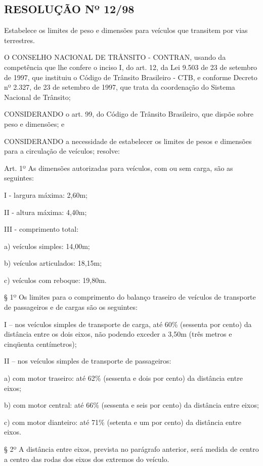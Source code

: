 \begin{anexosenv}

\partanexos

\chapter{RESOLUÇÃO Nº 12/98}

Estabelece os limites de peso e dimensões para veículos que transitem por vias terrestres.

O CONSELHO NACIONAL DE TRÂNSITO - CONTRAN, usando da competência que lhe confere o inciso I, do art. 12, da Lei 9.503 de 23 de setembro de 1997, que instituiu o Código de Trânsito Brasileiro - CTB, e conforme Decreto nº 2.327, de 23 de setembro de 1997, que trata da coordenação do Sistema Nacional de Trânsito;

CONSIDERANDO o art. 99, do Código de Trânsito Brasileiro, que dispõe sobre peso e dimensões; e

CONSIDERANDO a necessidade de estabelecer os limites de pesos e dimensões para a circulação de veículos; resolve:

Art. 1º As dimensões autorizadas para veículos, com ou sem carga, são as seguintes:

I   - largura máxima: 2,60m;

II  - altura máxima: 4,40m;

III - comprimento total:

a) veículos simples: 14,00m;

b) veículos articulados: 18,15m;

c) veículos com reboque: 19,80m.

§ 1º Os limites para o comprimento do balanço traseiro de veículos de transporte de passageiros e de cargas são os seguintes:

I – nos veículos simples de transporte de carga, até 60\% (sessenta por cento) da distância entre os dois eixos, não podendo exceder a 3,50m (três metros e cinqüenta centímetros);

II – nos veículos simples de transporte de passageiros:

a) com motor traseiro: até 62\% (sessenta e dois por cento) da distância entre eixos;

b) com motor central: até 66\% (sessenta e seis por cento) da distância entre eixos;

c) com motor dianteiro: até 71\% (setenta e um por cento) da distância entre eixos.

§ 2º A distância entre eixos, prevista no parágrafo anterior, será medida de centro a centro das rodas dos eixos dos extremos do veículo.


\end{anexosenv}
